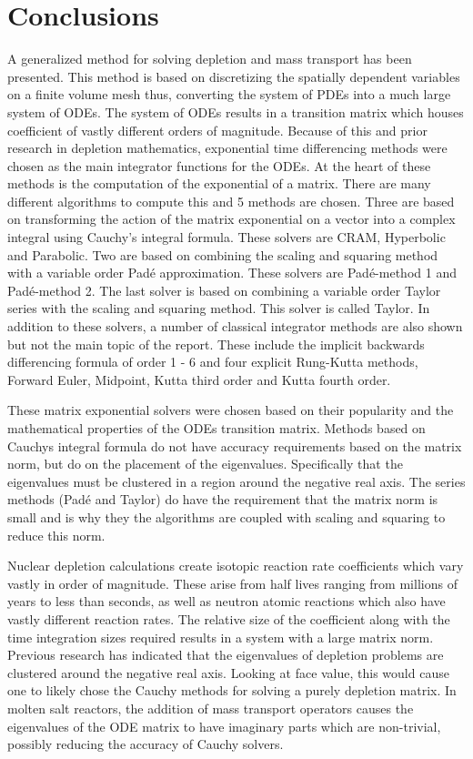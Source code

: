 \chapter{Conclusions} \label{ch:conclusions}
A generalized method for solving depletion and mass transport has been presented. This method is based on discretizing the spatially dependent variables on a finite volume mesh thus, converting the system of PDEs into a much large system of ODEs. The system of ODEs results in a transition matrix which houses coefficient of vastly different orders of magnitude. Because of this and prior research in depletion mathematics, exponential time differencing methods were chosen as the main integrator functions for the ODEs. At the heart of these methods is the computation of the exponential of a matrix. There are many different algorithms to compute this and 5 methods are chosen. Three are based on transforming the action of the matrix exponential on a vector into a complex integral using Cauchy's integral formula. These solvers are CRAM, Hyperbolic and Parabolic. Two are based on combining the scaling and squaring method with a variable order Pad\'e approximation. These solvers are Pad\'e-method 1 and Pad\'e-method 2. The last solver is based on combining a variable order Taylor series with the scaling and squaring method. This solver is called Taylor. In addition to these solvers, a number of classical integrator methods are also shown but not the main topic of the report. These include the implicit backwards differencing formula of order 1 - 6 and four explicit Rung-Kutta methods, Forward Euler, Midpoint, Kutta third order and Kutta fourth order. 

These matrix exponential solvers were chosen based on their popularity and the mathematical properties of the ODEs transition matrix. Methods based on Cauchys integral formula do not have accuracy requirements based on the matrix norm, but do on the placement of the eigenvalues. Specifically that the eigenvalues must be clustered in a region around the negative real axis. The series methods (Pad\'e and Taylor) do have the requirement that the matrix norm is small and is why they the algorithms are coupled with scaling and squaring to reduce this norm. 

Nuclear depletion calculations create isotopic reaction rate coefficients which vary vastly in order of magnitude. These arise from half lives ranging from millions of years to less than seconds, as well as neutron atomic reactions which also have vastly different reaction rates. The relative size of the coefficient along with the time integration sizes required results in a system with a large matrix norm. Previous research has indicated that the eigenvalues of depletion problems are clustered around the negative real axis. Looking at face value, this would cause one to likely chose the Cauchy methods for solving a purely depletion matrix. In molten salt reactors, the addition of mass transport operators causes the eigenvalues of the ODE matrix to have imaginary parts which are non-trivial, possibly reducing the accuracy of Cauchy solvers. 

